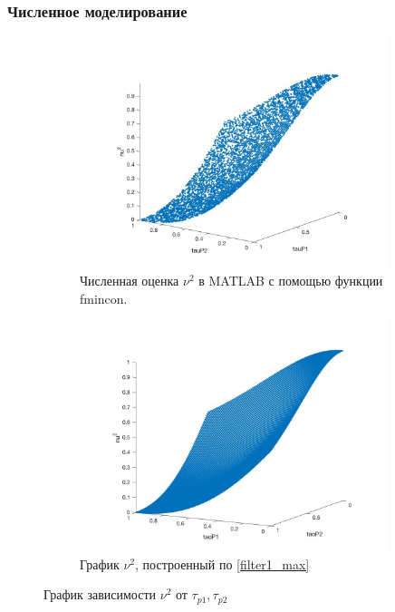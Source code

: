 \documentclass[a4paper,article,14pt]{extarticle}
\begin{document}
\subsubsection{Численное моделирование}
\begin{figure}[H]
\begin{subfigure}{.5\textwidth}
  \includegraphics[width=9cm]{images/filter1e.jpg}
  \caption{Численная оценка $\nu^2$ в MATLAB с помощью функции fmincon.}
  \label{fig:sub1}
\end{subfigure}%
\begin{subfigure}{.5\textwidth}
\includegraphics[width=9cm]{images/filter1_1.jpg}
  \caption{График $\nu^2$, построенный по \eqref{filter1_max}}
  \label{fig:sub2}
\end{subfigure}
\caption{График зависимости $\nu^2$ от $\tau_{p1}, \tau_{p2}$}
\label{fig:filter1_fig}
\end{figure}


\pagebreak
\end{document}
